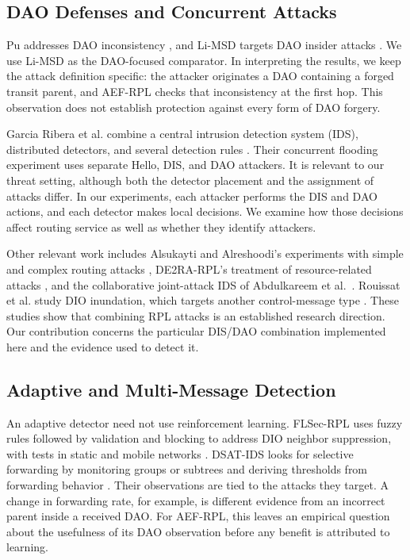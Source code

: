 \documentclass[journal]{IEEEtran}
\begin{document}
\subsection{DAO Defenses and Concurrent Attacks}
Pu addresses DAO inconsistency \cite{pu2018}, and Li-MSD targets DAO insider attacks \cite{limsd2024}. We use Li-MSD as the DAO-focused comparator. In interpreting the results, we keep the attack definition specific: the attacker originates a DAO containing a forged transit parent, and AEF-RPL checks that inconsistency at the first hop. This observation does not establish protection against every form of DAO forgery.

Garcia Ribera et al. combine a central intrusion detection system (IDS), distributed detectors, and several detection rules \cite{garciaribera2022}. Their concurrent flooding experiment uses separate Hello, DIS, and DAO attackers. It is relevant to our threat setting, although both the detector placement and the assignment of attacks differ. In our experiments, each attacker performs the DIS and DAO actions, and each detector makes local decisions. We examine how those decisions affect routing service as well as whether they identify attackers.

Other relevant work includes Alsukayti and Alreshoodi's experiments with simple and complex routing attacks \cite{alsukayti2023}, DE2RA-RPL's treatment of resource-related attacks \cite{de2rarpl2024}, and the collaborative joint-attack IDS of Abdulkareem et al.\ \cite{abdulkareem2024}. Rouissat et al. study DIO inundation, which targets another control-message type \cite{rouissat2023}. These studies show that combining RPL attacks is an established research direction. Our contribution concerns the particular DIS/DAO combination implemented here and the evidence used to detect it.

\subsection{Adaptive and Multi-Message Detection}
An adaptive detector need not use reinforcement learning. FLSec-RPL uses fuzzy rules followed by validation and blocking to address DIO neighbor suppression, with tests in static and mobile networks \cite{flsecrpl2024}. DSAT-IDS looks for selective forwarding by monitoring groups or subtrees and deriving thresholds from forwarding behavior \cite{dsatids2024}. Their observations are tied to the attacks they target. A change in forwarding rate, for example, is different evidence from an incorrect parent inside a received DAO. For AEF-RPL, this leaves an empirical question about the usefulness of its DAO observation before any benefit is attributed to learning.
\end{document}
